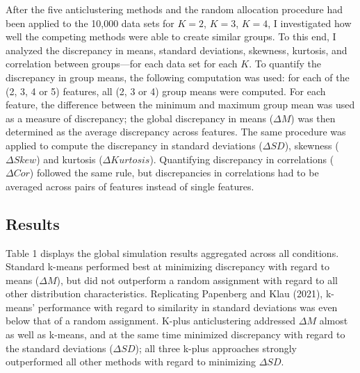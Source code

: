 \documentclass[
  man,floatsintext]{apa7}
\begin{document}
After the five anticlustering methods and the random allocation procedure had been applied to the 10,000 data sets for \(K = 2\), \(K = 3\), \(K = 4\), I investigated how well the competing methods were able to create similar groups. To this end, I analyzed the discrepancy in means, standard deviations, skewness, kurtosis, and correlation between groups---for each data set for each \(K\). To quantify the discrepancy in group means, the following computation was used: for each of the (2, 3, 4 or 5) features, all (2, 3 or 4) group means were computed. For each feature, the difference between the minimum and maximum group mean was used as a measure of discrepancy; the global discrepancy in means (\(\Delta M\)) was then determined as the average discrepancy across features. The same procedure was applied to compute the discrepancy in standard deviations (\(\Delta \mathit{SD}\)), skewness (\(\Delta \mathit{Skew}\)) and kurtosis (\(\Delta \mathit{Kurtosis}\)). Quantifying discrepancy in correlations (\(\Delta \mathit{Cor}\)) followed the same rule, but discrepancies in correlations had to be averaged across pairs of features instead of single features.

\hypertarget{results}{%
\subsection{Results}\label{results}}

Table 1 displays the global simulation results aggregated across all conditions. Standard k-means performed best at minimizing discrepancy with regard to means (\(\Delta \mathit{M}\)), but did not outperform a random assignment with regard to all other distribution characteristics. Replicating Papenberg and Klau (2021), k-means' performance with regard to similarity in standard deviations was even below that of a random assignment. K-plus anticlustering addressed \(\Delta \mathit{M}\) almost as well as k-means, and at the same time minimized discrepancy with regard to the standard deviations (\(\Delta \mathit{SD}\)); all three k-plus approaches strongly outperformed all other methods with regard to minimizing \(\Delta \mathit{SD}\).
\end{document}
